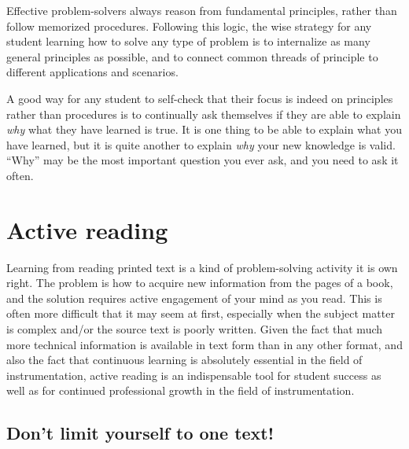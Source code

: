 Effective problem-solvers always reason from fundamental principles, rather than follow memorized procedures.  Following this logic, the wise strategy for any student learning how to solve any type of problem is to internalize as many general principles as possible, and to connect common threads of principle to different applications and scenarios.

A good way for any student to self-check that their focus is indeed on principles rather than procedures is to continually ask themselves if they are able to explain \textit{why} what they have learned is true.  It is one thing to be able to explain what you have learned, but it is quite another to explain \textit{why} your new knowledge is valid.  ``Why'' may be the most important question you ever ask, and you need to ask it often.











\filbreak
\section{Active reading}

  

Learning from reading printed text is a kind of problem-solving activity it is own right.  The problem is how to acquire new information from the pages of a book, and the solution requires active engagement of your mind as you read.  This is often more difficult that it may seem at first, especially when the subject matter is complex and/or the source text is poorly written.  Given the fact that much more technical information is available in text form than in any other format, and also the fact that continuous learning is absolutely essential in the field of instrumentation, active reading is an indispensable tool for student success as well as for continued professional growth in the field of instrumentation.






\filbreak
\subsection{Don't limit yourself to one text!}

